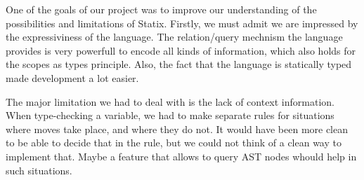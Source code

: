 One of the goals of our project was to improve our understanding of the possibilities and limitations of Statix. Firstly, we must admit we are impressed by the expressiviness of the language. The relation/query mechnism the language provides is very powerfull to encode all kinds of information, which also holds for the scopes as types principle. Also, the fact that the language is statically typed made development a lot easier.

The major limitation we had to deal with is the lack of context information. When type-checking a variable, we had to make separate rules for situations where moves take place, and where they do not. It would have been more clean to be able to decide that in the rule, but we could not think of a clean way to implement that. Maybe a feature that allows to query AST nodes whould help in such situations.


